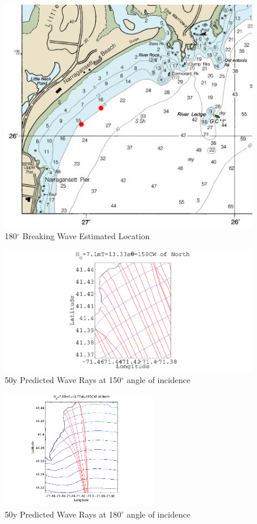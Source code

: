 \documentclass[10pt,letterpaper,titlepage]{report}
\begin{document}
\begin{appendices}
\begin{figure}[H]
\centering
\includegraphics[width=1.0\textwidth]{./img/breaks180.png}
\caption{180$^{\circ}$ Breaking Wave Estimated Location}
\label{fig:180degbreaker}
\end{figure}

\begin{figure}[H]
\centering
\includegraphics[width=1.0\textwidth]{./img/50y_150deg.pdf}
\caption{50y Predicted Wave Rays at 150$^{\circ}$ angle of incidence}
\label{fig:50y150deg}
\end{figure}

\begin{figure}[H]
\centering
\includegraphics[width=0.6\textwidth]{./img/50y_180deg.pdf}
\caption{50y Predicted Wave Rays at 180$^{\circ}$ angle of incidence}
\label{fig:50y180deg}
\end{figure}


\end{appendices}
\end{document}
